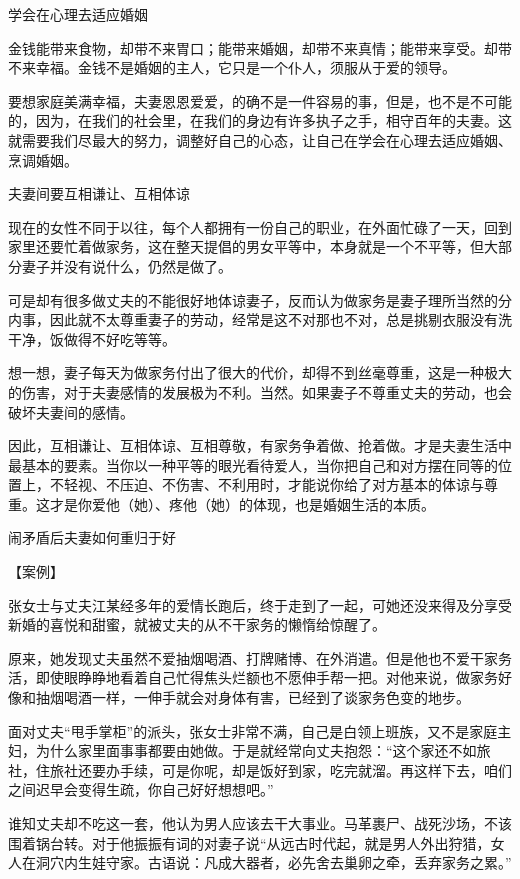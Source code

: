\documentclass[12pt,UTF8,openany]{ctexbook}
\begin{document}
学会在心理去适应婚姻


金钱能带来食物，却带不来胃口；能带来婚姻，却带不来真情；能带来享受。却带不来幸福。金钱不是婚姻的主人，它只是一个仆人，须服从于爱的领导。

要想家庭美满幸福，夫妻恩恩爱爱，的确不是一件容易的事，但是，也不是不可能的，因为，在我们的社会里，在我们的身边有许多执子之手，相守百年的夫妻。这就需要我们尽最大的努力，调整好自己的心态，让自己在学会在心理去适应婚姻、烹调婚姻。





夫妻间要互相谦让、互相体谅


现在的女性不同于以往，每个人都拥有一份自己的职业，在外面忙碌了一天，回到家里还要忙着做家务，这在整天提倡的男女平等中，本身就是一个不平等，但大部分妻子并没有说什么，仍然是做了。

可是却有很多做丈夫的不能很好地体谅妻子，反而认为做家务是妻子理所当然的分内事，因此就不太尊重妻子的劳动，经常是这不对那也不对，总是挑剔衣服没有洗干净，饭做得不好吃等等。

想一想，妻子每天为做家务付出了很大的代价，却得不到丝毫尊重，这是一种极大的伤害，对于夫妻感情的发展极为不利。当然。如果妻子不尊重丈夫的劳动，也会破坏夫妻间的感情。

因此，互相谦让、互相体谅、互相尊敬，有家务争着做、抢着做。才是夫妻生活中最基本的要素。当你以一种平等的眼光看待爱人，当你把自己和对方摆在同等的位置上，不轻视、不压迫、不伤害、不利用时，才能说你给了对方基本的体谅与尊重。这才是你爱他（她）、疼他（她）的体现，也是婚姻生活的本质。





闹矛盾后夫妻如何重归于好


【案例】

张女士与丈夫江某经多年的爱情长跑后，终于走到了一起，可她还没来得及分享受新婚的喜悦和甜蜜，就被丈夫的从不干家务的懒惰给惊醒了。

原来，她发现丈夫虽然不爱抽烟喝酒、打牌赌博、在外消遣。但是他也不爱干家务活，即使眼睁睁地看着自己忙得焦头烂额也不愿伸手帮一把。对他来说，做家务好像和抽烟喝酒一样，一伸手就会对身体有害，已经到了谈家务色变的地步。

面对丈夫“甩手掌柜”的派头，张女士非常不满，自己是白领上班族，又不是家庭主妇，为什么家里面事事都要由她做。于是就经常向丈夫抱怨：“这个家还不如旅社，住旅社还要办手续，可是你呢，却是饭好到家，吃完就溜。再这样下去，咱们之间迟早会变得生疏，你自己好好想想吧。”

谁知丈夫却不吃这一套，他认为男人应该去干大事业。马革裹尸、战死沙场，不该围着锅台转。对于他振振有词的对妻子说“从远古时代起，就是男人外出狩猎，女人在洞穴内生娃守家。古语说：凡成大器者，必先舍去巢卵之牵，丢弃家务之累。”
\end{document}

